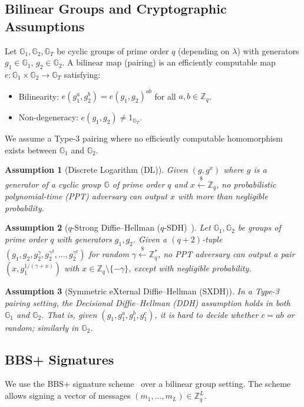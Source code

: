 \documentclass[11pt]{article}
\theoremstyle{definitionstyle}
\newtheorem{assumption}{Assumption}[section]
\theoremstyle{plain}
\begin{document}
\subsection{Bilinear Groups and Cryptographic Assumptions}
Let $\mathbb{G}_1, \mathbb{G}_2, \mathbb{G}_T$ be cyclic groups of prime order $q$ (depending on $\lambda$) with generators $g_1 \in \mathbb{G}_1$, $g_2 \in \mathbb{G}_2$. A bilinear map (pairing) is an efficiently computable map $e: \mathbb{G}_1 \times \mathbb{G}_2 \to \mathbb{G}_T$ satisfying:
\begin{itemize}
\item Bilinearity: $e(g_1^a, g_2^b) = e(g_1, g_2)^{ab}$ for all $a,b \in \mathbb{Z}_q$.
\item Non-degeneracy: $e(g_1, g_2) \neq 1_{\mathbb{G}_T}$.
\end{itemize}
We assume a Type-3 pairing where no efficiently computable homomorphism exists between $\mathbb{G}_1$ and $\mathbb{G}_2$.

\begin{assumption}[Discrete Logarithm (DL)]
Given $(g, g^x)$ where $g$ is a generator of a cyclic group $\mathbb{G}$ of prime order $q$ and $x \xleftarrow{\$} \mathbb{Z}_q$, no probabilistic polynomial-time (PPT) adversary can output $x$ with more than negligible probability.
\end{assumption}

\begin{assumption}[$q$-Strong Diffie--Hellman ($q$-SDH)~\cite{BB04}]
Let $\mathbb{G}_1, \mathbb{G}_2$ be groups of prime order $q$ with generators $g_1, g_2$. Given a $(q+2)$-tuple $(g_1, g_2, g_2^\gamma, g_2^{\gamma^2}, \dots, g_2^{\gamma^q})$ for random $\gamma \xleftarrow{\$} \mathbb{Z}_q^*$, no PPT adversary can output a pair $(x, g_1^{1/(\gamma+x)})$ with $x \in \mathbb{Z}_q \setminus \{-\gamma\}$, except with negligible probability.
\end{assumption}

\begin{assumption}[Symmetric eXternal Diffie--Hellman (SXDH)]
In a Type-3 pairing setting, the Decisional Diffie--Hellman (DDH) assumption holds in both $\mathbb{G}_1$ and $\mathbb{G}_2$. That is, given $(g_1, g_1^a, g_1^b, g_1^c)$, it is hard to decide whether $c = ab$ or random; similarly in $\mathbb{G}_2$.
\end{assumption}

\subsection{BBS+ Signatures}
We use the BBS+ signature scheme~\cite{BBS04,CFRG-BBS} over a bilinear group setting. The scheme allows signing a vector of messages $(m_1,\dots,m_L) \in \mathbb{Z}_q^L$.
\end{document}

